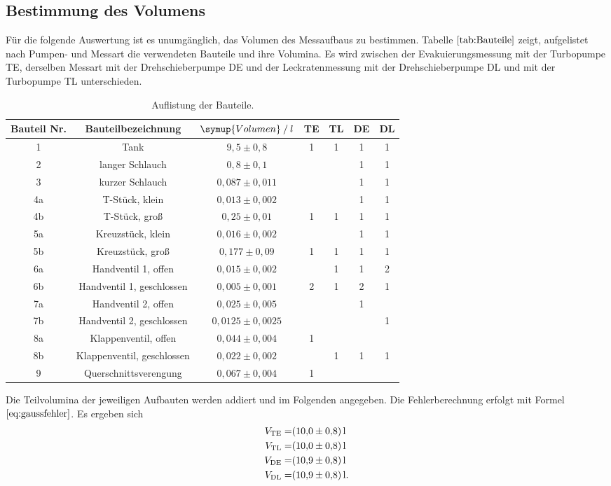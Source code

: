 \subsection{Bestimmung des Volumens}
Für die folgende Auswertung ist es unumgänglich, das Volumen des Messaufbaus zu bestimmen.
Tabelle $\ref{tab:Bauteile}$ zeigt, aufgelistet nach Pumpen- und Messart die verwendeten Bauteile und ihre Volumina.
Es wird zwischen der Evakuierungsmessung mit der Turbopumpe TE, derselben Messart mit der Drehschieberpumpe DE und der Leckratenmessung
mit der Drehschieberpumpe DL und mit der Turbopumpe TL unterschieden.\newline

\begin{table}[!hht]
	\centering
	\begin{tabular}{|c|c|c|c|c|c|c|}
		\hline
		Bauteil Nr. & Bauteilbezeichnung & {$\symup{Volumen} \:/\: l$}& TE & TL & DE & DL\\ \hline
		1	&	Tank & $9,5 \pm 0,8$ & 1 & 1 & 1 & 1 \\ \hline
		2	&	langer Schlauch & $0,8 \pm 0,1$ &  &  & 1 & 1 \\	\hline
		3	&	kurzer Schlauch & $0,087 \pm 0,011$ &  &  & 1 & 1 \\	\hline
		4a	&	T-Stück, klein & $0,013 \pm 0,002$ &  &  & 1 & 1 \\	\hline
		4b	&	T-Stück, groß & $0,25 \pm 0,01$ & 1 & 1 & 1 & 1 \\	\hline
		5a	&	Kreuzstück, klein & $0,016 \pm 0,002$ &  &  & 1 & 1 \\	\hline
		5b	&	Kreuzstück, groß & $0,177 \pm 0,09$ & 1 & 1 & 1 & 1 \\	\hline
		6a	&	Handventil 1, offen & $0,015 \pm 0,002$ &  & 1 & 1 & 2 \\	\hline
		6b	&	Handventil 1, geschlossen & $0,005 \pm 0,001$ &  2 & 1 & 2 & 1 \\	\hline
		7a	&	Handventil 2, offen & $0,025 \pm 0,005$ &  &  & 1 &  \\	\hline
		7b	&	Handventil 2, geschlossen & $0,0125 \pm 0,0025$ &  &  &  & 1 \\	\hline
		8a	&	Klappenventil, offen & $0,044 \pm 0,004$ & 1 &  &  &  \\	\hline
		8b	&	Klappenventil, geschlossen & $0,022 \pm 0,002$ &  & 1 & 1 & 1 \\	\hline
		9	&	Querschnittsverengung & $0,067 \pm 0,004$ & 1 &  &  &  \\	\hline
	\end{tabular}
	\caption{Auflistung der Bauteile.\cite{anleitung}}
	\label{tab:Bauteile}
\end{table}
Die Teilvolumina der jeweiligen Aufbauten werden addiert und im Folgenden angegeben. Die Fehlerberechnung erfolgt mit Formel $\ref{eq:gaussfehler}$.
Es ergeben sich
\begin{align*}
   V_\text{TE}=&\SI{10,0 \pm 0,8}{l}\\
   V_\text{TL}=&\SI{10,0 \pm 0,8}{l}\\
   V_\text{DE}=&\SI{10,9 \pm 0,8}{l}\\
   V_\text{DL}=&\SI{10,9 \pm 0,8}{l}.
\end{align*}

